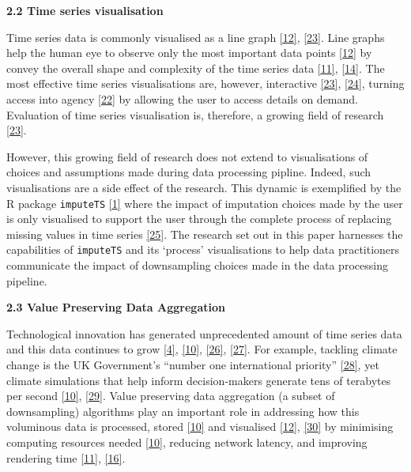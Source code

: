 \documentclass{article}
\begin{document}
\textbf{2.2 Time series visualisation}

Time series data is commonly visualised as a line graph
\protect\hyperlink{ref-Sveinn}{{[}12{]}},
\protect\hyperlink{ref-timenotes}{{[}23{]}}. Line graphs help the human
eye to observe only the most important data points
\protect\hyperlink{ref-Sveinn}{{[}12{]}} by convey the overall shape and
complexity of the time series data
\protect\hyperlink{ref-datapoint}{{[}11{]}},
\protect\hyperlink{ref-downsampling}{{[}14{]}}. The most effective time
series visualisations are, however, interactive
\protect\hyperlink{ref-timenotes}{{[}23{]}},
\protect\hyperlink{ref-plotly}{{[}24{]}}, turning access into agency
\protect\hyperlink{ref-transparency_fallacy}{{[}22{]}} by allowing the
user to access details on demand. Evaluation of time series
visualisation is, therefore, a growing field of research
\protect\hyperlink{ref-timenotes}{{[}23{]}}.

However, this growing field of research does not extend to
visualisations of choices and assumptions made during data processing
pipline. Indeed, such visualisations are a side effect of the research.
This dynamic is exemplified by the R package \texttt{imputeTS}
\protect\hyperlink{ref-imputeTS_R}{{[}1{]}} where the impact of
imputation choices made by the user is only visualised to support the
user through the complete process of replacing missing values in time
series \protect\hyperlink{ref-imputeTS}{{[}25{]}}. The research set out
in this paper harnesses the capabilities of \texttt{imputeTS} and its
`process' visualisations to help data practitioners communicate the
impact of downsampling choices made in the data processing pipeline.

\textbf{2.3 Value Preserving Data Aggregation}

Technological innovation has generated unprecedented amount of time
series data and this data continues to grow
\protect\hyperlink{ref-data2020}{{[}4{]}},
\protect\hyperlink{ref-TVStore}{{[}10{]}},
\protect\hyperlink{ref-storage}{{[}26{]}},
\protect\hyperlink{ref-CatchUp}{{[}27{]}}. For example, tackling climate
change is the UK Government's ``number one international priority''
\protect\hyperlink{ref-IR}{{[}28{]}}, yet climate simulations that help
inform decision-makers generate tens of terabytes per second
\protect\hyperlink{ref-TVStore}{{[}10{]}},
\protect\hyperlink{ref-climate}{{[}29{]}}. Value preserving data
aggregation (a subset of downsampling) algorithms play an important role
in addressing how this voluminous data is processed, stored
\protect\hyperlink{ref-TVStore}{{[}10{]}} and visualised
\protect\hyperlink{ref-Sveinn}{{[}12{]}},
\protect\hyperlink{ref-dashql}{{[}30{]}} by minimising computing
resources needed \protect\hyperlink{ref-TVStore}{{[}10{]}}, reducing
network latency, and improving rendering time
\protect\hyperlink{ref-datapoint}{{[}11{]}},
\protect\hyperlink{ref-MinMaxLTTB}{{[}16{]}}.
\end{document}
